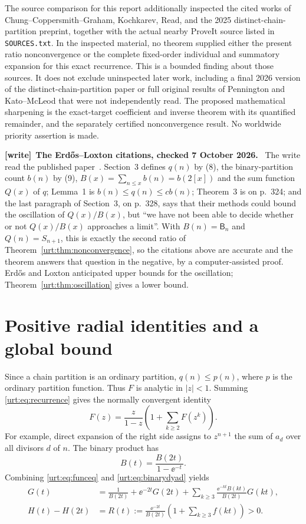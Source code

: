 \documentclass[11pt,letterpaper]{article}
\theoremstyle{remark}\newtheorem{remark}[theorem]{Remark}
\newcommand{\Beta}{\mathsf B}
\newenvironment{writenote}[1][]{\par\smallskip\begingroup\small
 \noindent\textbf{[write]}\if\relax\detokenize{#1}\relax\else~\textbf{#1.}\fi\ }%
 {\par\endgroup\smallskip}
\begin{document}
The source comparison for this report additionally inspected the cited works of Chung--Coppersmith--Graham, Kochkarev, Read, and the 2025 distinct-chain-partition preprint, together with the actual nearby ProveIt source listed in \texttt{SOURCES.txt}. In the inspected material, no theorem supplied either the present ratio nonconvergence or the complete fixed-order individual and summatory expansion for this exact recurrence. This is a bounded finding about those sources. It does not exclude uninspected later work, including a final 2026 version of the distinct-chain-partition paper or full original results of Pennington and Kato--McLeod that were not independently read. The proposed mathematical sharpening is the exact-target coefficient and inverse theorem with its quantified remainder, and the separately certified nonconvergence result. No worldwide priority assertion is made.

\begin{writenote}[The Erd\H{o}s--Loxton citations, checked 7 October 2026]
The write read the published paper~\cite{el}. Section~3 defines $q(n)$ by
(8), the binary-partition count $b(n)$ by (9), $B(x)=\sum_{n\le x}b(n)=b(2[x])$
and the sum function $Q(x)$ of $q$; Lemma~1 is $b(n)\le q(n)\le cb(n)$;
Theorem~3 is on p.~324; and the last paragraph of Section~3, on p.~328, says
that their methods could bound the oscillation of $Q(x)/B(x)$, but ``we have
not been able to decide whether or not $Q(x)/B(x)$ approaches a limit''. With $B(n)=\Beta_n$ and $Q(n)=S_{n+1}$,
this is exactly the second ratio of Theorem~\ref{urt:thm:nonconvergence}, so
the citations above are accurate and the theorem answers that question in the
negative, by a computer-assisted proof. Erd\H{o}s and Loxton anticipated upper
bounds for the oscillation; Theorem~\ref{urt:thm:oscillation} gives a lower
bound.
\end{writenote}

\section{Positive radial identities and a global bound}\label{urt:sec:radial}
Since a chain partition is an ordinary partition, $q(n)\le p(n)$, where $p$ is the ordinary partition function. Thus $F$ is analytic in $|z|<1$. Summing \eqref{urt:eq:recurrence} gives the normally convergent identity
\begin{equation}\label{urt:eq:funceq}
 F(z)=\frac{z}{1-z}\left(1+\sum_{k\ge2}F(z^k)\right).
\end{equation}
For example, direct expansion of the right side assigns to $z^{n+1}$ the sum of $a_d$ over all divisors $d$ of $n$. The binary product has
\begin{equation}\label{urt:eq:binarydyad}
 B(t)=\frac{B(2t)}{1-\ee^{-t}}.
\end{equation}
Combining \eqref{urt:eq:funceq} and \eqref{urt:eq:binarydyad} yields
\begin{align}
 G(t)&=\frac1{B(2t)}+\ee^{-2t}G(2t)
       +\sum_{k\ge3}\frac{\ee^{-kt}B(kt)}{B(2t)}G(kt),\label{urt:eq:Grec}\\
 H(t)-H(2t)&=R(t):=
 \frac{\ee^{-2t}}{B(2t)}\left(1+\sum_{k\ge3}f(kt)\right)>0.\label{urt:eq:Hdiff}
\end{align}
\end{document}
